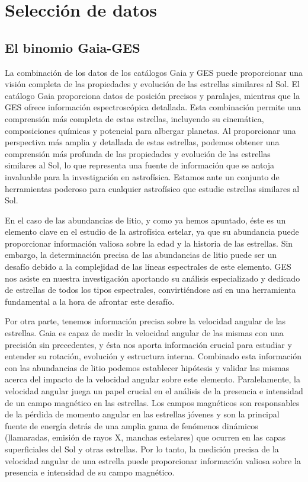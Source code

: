 \section{Selección de datos}
\subsection{El binomio Gaia-GES}
La combinación de los datos de los catálogos Gaia y GES puede proporcionar una visión completa de las propiedades y evolución de las estrellas similares al Sol. El catálogo Gaia proporciona datos de posición precisos y paralajes, mientras que la GES ofrece información espectroscópica detallada. Esta combinación permite una comprensión más completa de estas estrellas, incluyendo su cinemática, composiciones químicas y potencial para albergar planetas. Al proporcionar una perspectiva más amplia y detallada de estas estrellas, podemos obtener una comprensión más profunda de las propiedades y evolución de las estrellas similares al Sol, lo que representa una fuente de información que se antoja invaluable para la investigación en astrofísica. Estamos ante un conjunto de herramientas poderoso para cualquier astrofísico que estudie estrellas similares al Sol.\par

En el caso de las abundancias de litio, y como ya hemos apuntado, éste es un elemento clave en el estudio de la astrofísica estelar, ya que su abundancia puede proporcionar información valiosa sobre la edad y la historia de las estrellas. Sin embargo, la determinación precisa de las abundancias de litio puede ser un desafío debido a la complejidad de las líneas espectrales de este elemento. GES nos asiste en nuestra investigación aportando su análisis especializado y dedicado de estrellas de todos los tipos espectrales, convirtiéndose así en una herramienta fundamental a la hora de afrontar este desafío.\par

Por otra parte, tenemos información precisa sobre la velocidad angular de las estrellas. Gaia es capaz de medir la velocidad angular de las mismas con una precisión sin precedentes, y ésta nos aporta información crucial para estudiar y entender su rotación, evolución y estructura interna. Combinado esta información con las abundancias de litio podemos establecer hipótesis y validar las mismas acerca del impacto de la velocidad angular sobre este elemento. Paralelamente, la velocidad angular juega un papel crucial en el análisis de la presencia e intensidad de un campo magnético en las estrellas. Los campos magnéticos son responsables de la pérdida de momento angular en las estrellas jóvenes y son la principal fuente de energía detrás de una amplia gama de fenómenos dinámicos (llamaradas, emisión de rayos X, manchas estelares) que ocurren en las capas superficiales del Sol y otras estrellas. Por lo tanto, la medición precisa de la velocidad angular de una estrella puede proporcionar información valiosa sobre la presencia e intensidad de su campo magnético.\par

